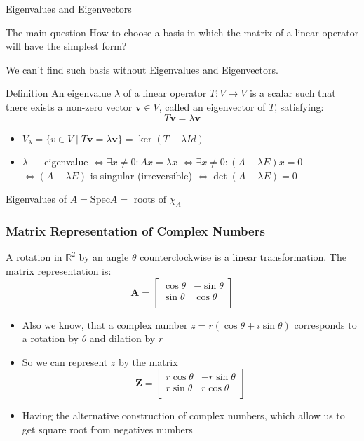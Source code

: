 \documentclass[fullscreen=true, bookmarks=true, hyperref={pdfencoding=unicode}]{beamer}
\begin{document}
\begin{frame}{Eigenvalues and Eigenvectors}
   \begin{block}{The main question}
    How to choose a basis in which the matrix of a linear operator 
    will have the simplest form?
   \end{block}

   \pause
   We can't find such basis without Eigenvalues and Eigenvectors.
   \pause
   \begin{block}{Definition}
    An \alert{eigenvalue} $\lambda$ of a linear operator $T: V \rightarrow V$ is a scalar such that there exists a non-zero vector $\mathbf{v} \in V$, called an \alert{eigenvector} of $T$, satisfying:
    \[
    T\mathbf{v} = \lambda \mathbf{v}
    \]
   \end{block}
   \begin{itemize}
    \pause
    \item $V_\lambda = \{ v \in V \mid T \mathbf{v} = \lambda \mathbf{v} \} = \operatorname{ker}(T - \lambda Id)$
    \pause
    \item $\lambda$ — eigenvalue $\Leftrightarrow \exists x \neq 0: Ax = \lambda x$ 
    $\Leftrightarrow \exists x \neq 0: (A - \lambda E) x = 0$
    $\Leftrightarrow (A - \lambda E)$ is singular (irreversible)
    $\Leftrightarrow \det (A - \lambda E) = 0$
   \end{itemize}
   \pause
   Eigenvalues of $A = \mathrm{Spec}A = \text{ roots of } \chi_A$
   
\end{frame}


\begin{frame}
  \frametitle{Matrix Representation of Complex Numbers}
    A rotation in $\mathbb{R}^2$ by an angle $\theta$ counterclockwise is a linear transformation. The matrix representation is:
    \[
    \mathbf{A} = \begin{bmatrix}
    \cos\theta & -\sin\theta \\
    \sin\theta & \cos\theta \\
    \end{bmatrix}
    \]

  \begin{itemize}
    \pause\item Also we know, that a complex number $z = r(\cos\theta + i\sin\theta)$ corresponds to a rotation by $\theta$ and dilation by $r$
    \pause\item So we can represent $z$ by the matrix 
    \[
    \mathbf{Z} = \begin{bmatrix}
    r\cos\theta & -r\sin\theta \\
    r\sin\theta & r\cos\theta \\
    \end{bmatrix}
    \]
    \pause\item Having the alternative construction of 
    complex numbers, which allow us to get square root from negatives numbers
  \end{itemize}
\end{frame}
\end{document}
